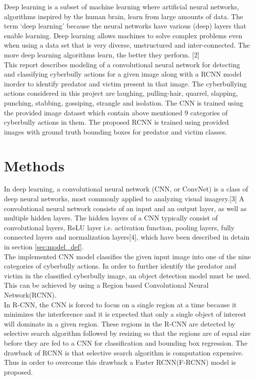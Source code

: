 \documentclass[12pt]{article}
\begin{document}
Deep learning is a subset of machine learning where artificial neural networks, algorithms inspired by the human brain, learn from large amounts of data. The term  ‘deep learning’ because the neural networks have various (deep) layers that enable learning. Deep learning allows machines to solve complex problems even when using a data set that is very diverse, unstructured and inter-connected. The more deep learning algorithms learn, the better they perform. [2] \\

This report describes modeling of a convolutional neural network for detecting and classifying cyberbully actions for a given image along with a RCNN model inorder to identify predator and victim present in that image. The cyberbullying actions considered in this project are laughing, pulling-hair, quarrel, slapping, punching, stabbing, gossiping, strangle and isolation. The CNN is trained using the provided image dataset which contain above mentioned 9 categories of cyberbully actions in them. The proposed RCNN is trained using provided images with ground truth bounding boxes for predator and victim classes.    

\newpage

\section{Methods}
In deep learning, a convolutional neural network (CNN, or ConvNet) is a class of deep neural networks, most commonly applied to analyzing visual imagery.[3] A convolutional neural network consists of an input and an output layer, as well as multiple hidden layers. The hidden layers of a CNN typically consist of convolutional layers, ReLU layer i.e. activation function, pooling layers, fully connected layers and normalization layers[4], which have been described in detain in section \ref{sec:model_def}. \\ 

The implemented CNN model classifies the given input image into one of the nine categories of cyberbully actions. In order to further identify the predator and victim in the classified cyberbully image, an object detection model must be used. This can be achieved by using a Region based Convolutional Neural Network(RCNN). \\

In R-CNN, the CNN is forced to focus on a single region at a time because it minimizes the interference and it is expected that only a single object of interest will dominate in a given region. These regions in the R-CNN are detected by selective search algorithm followed by resizing so that the regions are of equal size before they are fed to a CNN for classification and bounding box regression. The drawback of RCNN is that selective search algorithm is computation expensive. Thus in order to overcome this drawback a Faster RCNN(F-RCNN) model is proposed. \\
\end{document}
